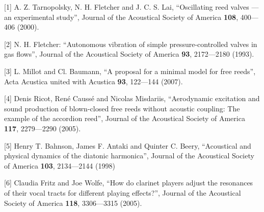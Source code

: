   \sectionreferences{}[1] A. Z. Tarnopolsky, N. H. Fletcher and J. C. S. Lai, 
  “Oscillating reed valves — an experimental study”, Journal of the Acoustical 
  Society of America \textbf{108}, 400—406 (2000). 

  [2] N. H. Fletcher: “Autonomous vibration of simple pressure-controlled 
  valves in gas flows”, Journal of the Acoustical Society of America 
  \textbf{93}, 2172—2180 (1993). 

  [3] L. Millot and Cl. Baumann, “A proposal for a minimal model for free 
  reeds”, Acta Acustica united with Acustica \textbf{93}, 122—144 (2007). 

  [4] Denis Ricot, René Caussé and Nicolas Misdariis, “Aerodynamic excitation 
  and sound production of blown-closed free reeds without acoustic coupling: 
  The example of the accordion reed”, Journal of the Acoustical Society of 
  America \textbf{117}, 2279—2290 (2005). 

  [5] Henry T. Bahnson, James F. Antaki and Quinter C. Beery, “Acoustical and 
  physical dynamics of the diatonic harmonica”, Journal of the Acoustical 
  Society of America \textbf{103}, 2134—2144 (1998) 

  [6] Claudia Fritz and Joe Wolfe, “How do clarinet players adjust the 
  resonances of their vocal tracts for different playing effects?”, Journal of 
  the Acoustical Society of America \textbf{118}, 3306—3315 (2005). 